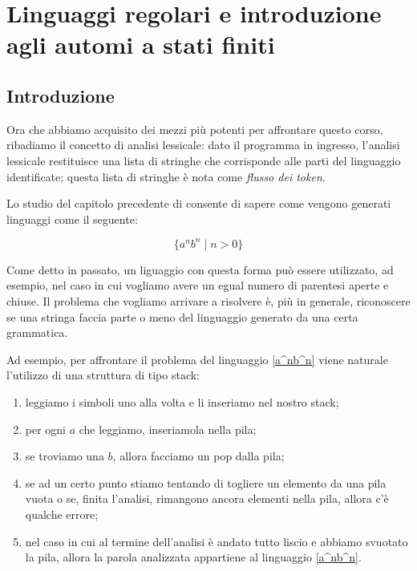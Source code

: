 \documentclass[class=book, crop=false, oneside, 12pt]{standalone}
\begin{document}
\chapter[Linguaggi regolari e introduzione agli automi]{Linguaggi regolari e introduzione agli automi a stati finiti}

\section{Introduzione}

Ora che abbiamo acquisito dei mezzi più potenti per affrontare questo corso, ribadiamo il concetto di analisi lessicale: dato il programma in ingresso, l'analisi lessicale restituisce una lista di stringhe che corrisponde alle parti del linguaggio identificate; questa lista di stringhe è nota come \emph{flusso dei token}.

Lo studio del capitolo precedente di consente di sapere come vengono generati linguaggi come il seguente:

\begin{equation}
    \label{a^nb^n}
    \{ a^n b^n \mid n > 0 \}    
\end{equation}

Come detto in passato, un liguaggio con questa forma può essere utilizzato, ad esempio, nel caso in cui vogliamo avere un egual numero di parentesi aperte e chiuse.
Il problema che vogliamo arrivare a risolvere è, più in generale, riconoscere se una stringa faccia parte o meno del linguaggio generato da una certa grammatica.

Ad esempio, per affrontare il problema del linguaggio \ref{a^nb^n} viene naturale l'utilizzo di una struttura di tipo stack:

\begin{enumerate}
    \item leggiamo i simboli uno alla volta e li inseriamo nel nostro stack;
    \item per ogni \(a\) che leggiamo, inseriamola nella pila;
    \item se troviamo una \(b\), allora facciamo un pop dalla pila;
    \item se ad un certo punto stiamo tentando di togliere un elemento da una pila vuota o se, finita l’analisi, rimangono ancora elementi nella pila, allora c’è qualche errore;
    \item nel caso in cui al termine dell’analisi è andato tutto liscio e abbiamo svuotato la pila, allora la parola analizzata appartiene al linguaggio \ref{a^nb^n}.
\end{enumerate} 
\end{document}
